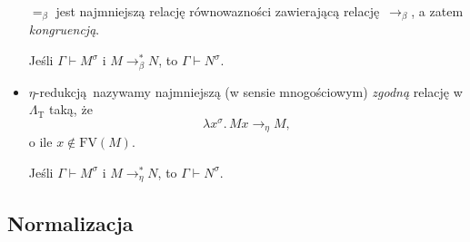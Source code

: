 \begin{definicja}
\begin{itemize}
    \(=_{\beta}\) jest najmniejszą relację równowazności zawierającą relację \(\longrightarrow_{\beta}\), a zatem \emph{kongruencją}.


  \begin{fakt}
    Jeśli \(\Gamma\vdash M^\sigma\) i \(M\longrightarrow^{*}_{\beta}N\), to
    \(\Gamma\vdash N^\sigma\).
  \end{fakt}
\item \(\eta\)-redukcją nazywamy najmniejszą (w sensie mnogościowym) \emph{zgodną} relację w \(\Lambda_{\mathrm{T}}\) taką, że
  \[
    \lambda x^\sigma.\, Mx\longrightarrow_{\eta} M,
  \]
    o ile \(x\not\in \mathrm{FV}(M)\).

  \begin{fakt}
    Jeśli \(\Gamma\vdash M^\sigma\) i \(M\longrightarrow^{*}_{\eta}N\), to
    \(\Gamma\vdash N^\sigma\).
  \end{fakt}

\end{itemize}
\end{definicja}
\subsection{Normalizacja}


